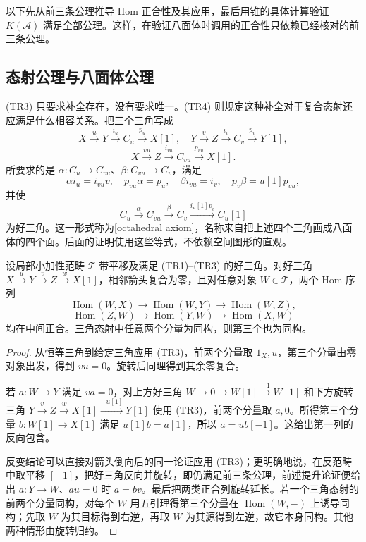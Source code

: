 \ProseParagraphBreak
以下先从前三条公理推导 Hom 正合性及其应用，最后用锥的具体计算验证 \(K(\mathcal A)\) 满足全部公理。这样，在验证八面体时调用的正合性只依赖已经核对的前三条公理。

\subsection{态射公理与八面体公理}
\label{b4:subsec:1602:02}

(TR3) 只要求补全存在，没有要求唯一。(TR4) 则规定这种补全对于复合态射还应满足什么相容关系。把三个三角写成
\[
 X\xrightarrow{u}Y\xrightarrow{i_u}C_u\xrightarrow{p_u}X[1],\quad
 Y\xrightarrow{v}Z\xrightarrow{i_v}C_v\xrightarrow{p_v}Y[1],
\]
\[
 X\xrightarrow{vu}Z\xrightarrow{i_{vu}}C_{vu}\xrightarrow{p_{vu}}X[1].
\]
所要求的是 \(\alpha:C_u\to C_{vu}\)、\(\beta:C_{vu}\to C_v\)，满足
\[
 \alpha i_u=i_{vu}v,\quad p_{vu}\alpha=p_u,\quad
 \beta i_{vu}=i_v,\quad p_v\beta=u[1]p_{vu},
\]
并使
\[
 C_u\xrightarrow{\alpha}C_{vu}\xrightarrow{\beta}C_v
 \xrightarrow{i_u[1]p_v}C_u[1]
\]
为好三角。这一形式称为[octahedral axiom]，名称来自把上述四个三角画成八面体的四个面。后面的证明使用这些等式，不依赖空间图形的直观。

\begin{lemma}\label{b4:lem:pretriangle-hom}
设局部小加性范畴 \(\mathcal T\) 带平移及满足 (TR1)--(TR3) 的好三角。对好三角 \(X\xrightarrow{u}Y\xrightarrow{v}Z\xrightarrow{w}X[1]\)，相邻箭头复合为零，且对任意对象 \(W\in\mathcal T\)，两个 Hom 序列
\[
 \operatorname{Hom}(W,X)\longrightarrow\operatorname{Hom}(W,Y)
 \longrightarrow\operatorname{Hom}(W,Z),
\]
\[
 \operatorname{Hom}(Z,W)\longrightarrow\operatorname{Hom}(Y,W)
 \longrightarrow\operatorname{Hom}(X,W)
\]
均在中间正合。三角态射中任意两个分量为同构，则第三个也为同构。
\end{lemma}
\begin{proof}
从恒等三角到给定三角应用 (TR3)，前两个分量取 \(1_X,u\)，第三个分量由零对象出发，得到 \(vu=0\)。旋转后同理得到其余零复合。

若 \(a:W\to Y\) 满足 \(va=0\)，对上方好三角
\(W\to0\to W[1]\xrightarrow{-1}W[1]\)
和下方旋转三角
\(Y\xrightarrow{v}Z\xrightarrow{w}X[1]\xrightarrow{-u[1]}Y[1]\)
使用 (TR3)，前两个分量取 \(a,0\)。所得第三个分量 \(b:W[1]\to X[1]\) 满足 \(u[1]b=a[1]\)，所以 \(a=ub[-1]\)。这给出第一列的反向包含。

反变结论可以直接对箭头倒向后的同一论证应用 (TR3)；更明确地说，在反范畴中取平移 \([-1]\)，把好三角反向并旋转，即仍满足前三条公理，前述提升论证便给出 \(a:Y\to W\)、\(au=0\) 时 \(a=bv\)。最后把两类正合列旋转延长。若一个三角态射的前两个分量同构，对每个 \(W\) 用五引理得第三个分量在 \(\operatorname{Hom}(W,-)\) 上诱导同构；先取 \(W\) 为其目标得到右逆，再取 \(W\) 为其源得到左逆，故它本身同构。其他两种情形由旋转归约。
\end{proof}


